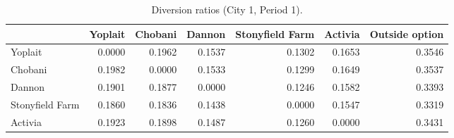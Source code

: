 \begin{table}[H]
\centering
\caption{Diversion ratios (City 1, Period 1).}
\label{tab:q13_div_c1t1}
\begin{tabular}{lrrrrrr}
\toprule
 & Yoplait & Chobani & Dannon & Stonyfield Farm & Activia & Outside option \\
\midrule
Yoplait & 0.0000 & 0.1962 & 0.1537 & 0.1302 & 0.1653 & 0.3546 \\
Chobani & 0.1982 & 0.0000 & 0.1533 & 0.1299 & 0.1649 & 0.3537 \\
Dannon & 0.1901 & 0.1877 & 0.0000 & 0.1246 & 0.1582 & 0.3393 \\
Stonyfield Farm & 0.1860 & 0.1836 & 0.1438 & 0.0000 & 0.1547 & 0.3319 \\
Activia & 0.1923 & 0.1898 & 0.1487 & 0.1260 & 0.0000 & 0.3431 \\
\bottomrule
\end{tabular}
\end{table}
